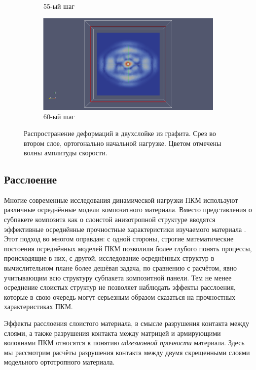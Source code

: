 \begin{figure}[H]
\begin{subfigure}[b]{0.5\textwidth}
\caption{55-ый шаг}
\end{subfigure}
\begin{subfigure}[b]{0.5\textwidth}
\centering
\includegraphics[width=1.0\textwidth]{png/two-graphite-layers/slice2_60.png}
\caption{60-ый шаг}
\end{subfigure}
\caption{Распространение деформаций в двухслойке из графита. Срез во втором слое, ортогонально начальной нагрузке. Цветом отмечены волны амплитуды скорости.}
\label{pic:two_graphite_slice2}
\end{figure}

\subsection{Расслоение}
	
	Многие современные исследования динамической нагрузки ПКМ используют различные осреднённые модели композитного материала.
	Вместо представления о субпакете композита как о слоистой анизотропной структуре вводятся эффективные осреднённые прочностные характеристики изучаемого материала \cite{bahvalov}.
	Этот подход во многом оправдан: с одной стороны, строгие математические постоения осреднённых моделей ПКМ позволили более глубого понять процессы, происходящие в них, с другой, исследование осреднённых структур в вычислительном плане более дешёвая задача, по сравнению с расчётом, явно учитывающим всю структуру субпакета композитной панели.
	Тем не менее осреднение слоистых структур не позволяет наблюдать эффекты расслоения, которые в свою очередь могут серьезным образом сказаться на прочностных характеристиках ПКМ.
	
	Эффекты расслоения слоистого материала, в смысле разрушения контакта между слоями, а также разрушения контакта между матрицей и армирующими волокнами ПКМ относятся к понятию \textit{адгезионной прочности} материала.
	Здесь мы рассмотрим расчёты разрушения контакта между двумя скрещенными слоями модельного ортотропного материала.
	
